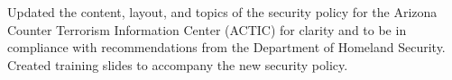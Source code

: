 


\begin{rExperience}

  \item Updated the content, layout, and topics of the security policy for the Arizona Counter Terrorism Information Center (ACTIC) for clarity and to be in compliance with recommendations from the Department of Homeland Security. Created training slides to accompany the new security policy.

\end{rExperience}
